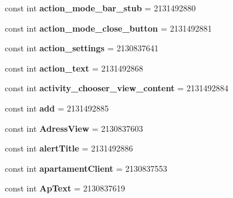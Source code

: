 \begin{DoxyCompactItemize}
const int {\bfseries action\+\_\+mode\+\_\+bar\+\_\+stub} = 2131492880
\item 
\mbox{\label{classst_delivery_1_1_resource_1_1_id_af1480beafdb6db04f81233a608561240}} 
const int {\bfseries action\+\_\+mode\+\_\+close\+\_\+button} = 2131492881
\item 
\mbox{\label{classst_delivery_1_1_resource_1_1_id_a329b6d3b8b896c7f18f3aab165d63a4e}} 
const int {\bfseries action\+\_\+settings} = 2130837641
\item 
\mbox{\label{classst_delivery_1_1_resource_1_1_id_a500d48d95afc3abb1898a8f1af61d552}} 
const int {\bfseries action\+\_\+text} = 2131492868
\item 
\mbox{\label{classst_delivery_1_1_resource_1_1_id_aa1924830039eea07c63c5ada6cd64036}} 
const int {\bfseries activity\+\_\+chooser\+\_\+view\+\_\+content} = 2131492884
\item 
\mbox{\label{classst_delivery_1_1_resource_1_1_id_a40332b345900eda540c0be1c82d9b0dc}} 
const int {\bfseries add} = 2131492885
\item 
\mbox{\label{classst_delivery_1_1_resource_1_1_id_a6c678d35ddaf8d538db7fadb1ffeffc8}} 
const int {\bfseries Adress\+View} = 2130837603
\item 
\mbox{\label{classst_delivery_1_1_resource_1_1_id_a682e4420995ede875663890d5e0ff9e7}} 
const int {\bfseries alert\+Title} = 2131492886
\item 
\mbox{\label{classst_delivery_1_1_resource_1_1_id_abea5546d7f19411cf70b52aaa2611c22}} 
const int {\bfseries apartament\+Client} = 2130837553
\item 
\mbox{\label{classst_delivery_1_1_resource_1_1_id_a6387b3f88c9d10de8051c04ed558086c}} 
const int {\bfseries Ap\+Text} = 2130837619
\item 
\mbox{\label{classst_delivery_1_1_resource_1_1_id_a846fcac459ab44d6b0967e415f4d9ed4}} 

\end{DoxyCompactItemize}
